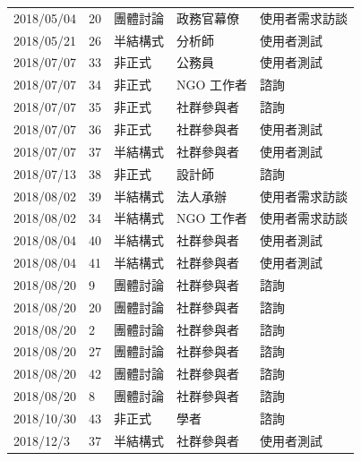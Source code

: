 \documentclass[12pt,a4paper]{article}
\begin{document}
{\begin{longtable}{l|l|l|l|l}
2018/05/04 & 20 & 團體討論 & 政務官幕僚 & 使用者需求訪談\\
2018/05/21 & 26 & 半結構式 & 分析師 & 使用者測試\\
2018/07/07 & 33 & 非正式 & 公務員 & 使用者測試\\
2018/07/07 & 34 & 非正式 & NGO 工作者 & 諮詢\\
2018/07/07 & 35 & 非正式 & 社群參與者 & 諮詢\\
2018/07/07 & 36 & 非正式 & 社群參與者 & 使用者測試\\
2018/07/07 & 37 & 半結構式 & 社群參與者 & 使用者測試\\
2018/07/13 & 38 & 非正式 & 設計師 & 諮詢\\
2018/08/02 & 39 & 半結構式 & 法人承辦 & 使用者需求訪談\\
2018/08/02 & 34 & 半結構式 & NGO 工作者 & 使用者需求訪談\\
2018/08/04 & 40 & 半結構式 & 社群參與者 & 使用者測試\\
2018/08/04 & 41 & 半結構式 & 社群參與者 & 使用者測試\\
2018/08/20 & 9 & 團體討論 & 社群參與者 & 諮詢\\
2018/08/20 & 20 & 團體討論 & 社群參與者 & 諮詢\\
2018/08/20 & 2 & 團體討論 & 社群參與者 & 諮詢\\
2018/08/20 & 27 & 團體討論 & 社群參與者 & 諮詢\\
2018/08/20 & 42 & 團體討論 & 社群參與者 & 諮詢\\
2018/08/20 & 8 & 團體討論 & 社群參與者 & 諮詢\\
2018/10/30 & 43 & 非正式 & 學者 & 諮詢\\
2018/12/3 & 37 & 半結構式 & 社群參與者 & 使用者測試\\
\bottomrule
\end{longtable}
}
\end{document}
